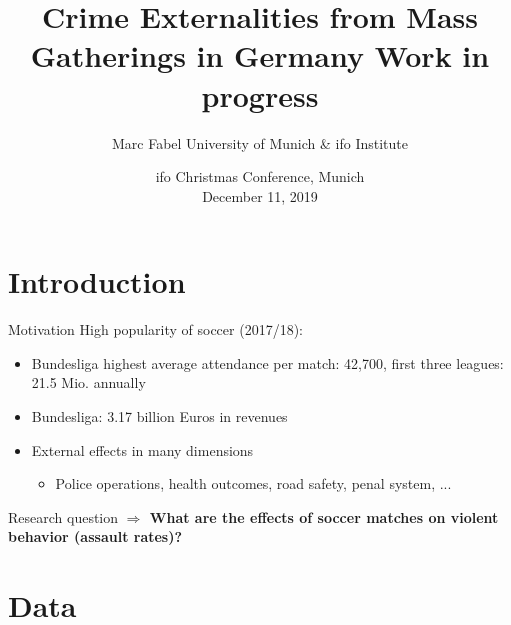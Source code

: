 \documentclass[usenames,dvipsnames]{beamer} %
\title[Soccer and Crime]{  \textbf{Crime Externalities from Mass Gatherings in Germany }\newline Work in progress}
\author[Marc Fabel]{Marc Fabel \newline University of Munich \& ifo Institute}
\date{ifo Christmas Conference, Munich\\December 11, 2019}
\begin{document}
\begin{frame}
	\titlepage
\end{frame}




\section{Introduction}
	\begin{frame}{Motivation}
		High popularity of soccer (2017/18):
		\begin{itemize}
			\item Bundesliga highest average attendance per match: 42,700, first three leagues: 21.5 Mio. annually
			\item Bundesliga: 3.17 billion Euros in revenues
			\item External effects in many dimensions
			\begin{itemize}
				\item Police operations, health outcomes, road safety, penal system, ...
			\end{itemize}						
		\end{itemize}


		\begin{block}{Research question}
			\textbf{$\Rightarrow$ What are the effects of soccer matches on violent behavior (assault rates)?}
		\end{block}
	\end{frame}
%	
%	




\section{Data}
\end{document}
